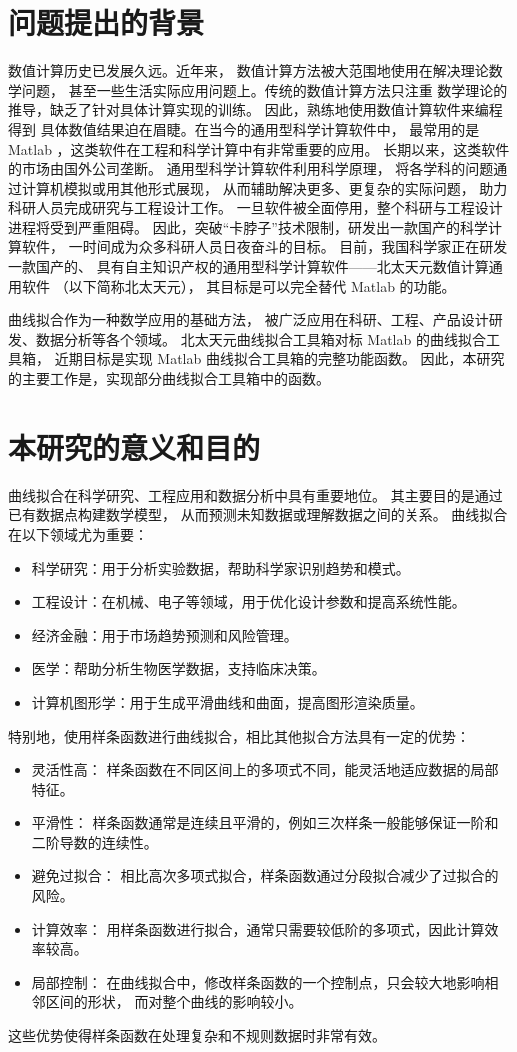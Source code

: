 \section{问题提出的背景}
数值计算历史已发展久远。近年来，
数值计算方法被大范围地使用在解决理论数学问题，
甚至一些生活实际应用问题上。传统的数值计算方法只注重
数学理论的推导，缺乏了针对具体计算实现的训练。
因此，熟练地使用数值计算软件来编程得到
具体数值结果迫在眉睫。在当今的通用型科学计算软件中，
最常用的是 Matlab ，这类软件在工程和科学计算中有非常重要的应用。
长期以来，这类软件的市场由国外公司垄断。
通用型科学计算软件利用科学原理，
将各学科的问题通过计算机模拟或用其他形式展现，
从而辅助解决更多、更复杂的实际问题，
助力科研人员完成研究与工程设计工作。
一旦软件被全面停用，整个科研与工程设计进程将受到严重阻碍。
因此，突破“卡脖子”技术限制，研发出一款国产的科学计算软件，
一时间成为众多科研人员日夜奋斗的目标。
目前，我国科学家正在研发一款国产的、
具有自主知识产权的通用型科学计算软件——北太天元数值计算通用软件
（以下简称北太天元），
其目标是可以完全替代 Matlab 的功能。\cite{baltamChinese}

曲线拟合作为一种数学应用的基础方法，
被广泛应用在科研、工程、产品设计研发、数据分析等各个领域。
北太天元曲线拟合工具箱对标 Matlab 的曲线拟合工具箱，
近期目标是实现 Matlab 曲线拟合工具箱的完整功能函数。
因此，本研究的主要工作是，实现部分曲线拟合工具箱中的函数。

\section{本研究的意义和目的}

\par 曲线拟合在科学研究、工程应用和数据分析中具有重要地位。
其主要目的是通过已有数据点构建数学模型，
从而预测未知数据或理解数据之间的关系。
曲线拟合在以下领域尤为重要：
\begin{itemize}
\item 科学研究：用于分析实验数据，帮助科学家识别趋势和模式。
\item 工程设计：在机械、电子等领域，用于优化设计参数和提高系统性能。
\item 经济金融：用于市场趋势预测和风险管理。
\item 医学：帮助分析生物医学数据，支持临床决策。
\item 计算机图形学：用于生成平滑曲线和曲面，提高图形渲染质量。
\end{itemize}
特别地，使用样条函数进行曲线拟合，相比其他拟合方法具有一定的优势：
\begin{itemize}
\item 灵活性高：
  样条函数在不同区间上的多项式不同，能灵活地适应数据的局部特征。
\item 平滑性：
  样条函数通常是连续且平滑的，例如三次样条一般能够保证一阶和二阶导数的连续性。
\item 避免过拟合：
  相比高次多项式拟合，样条函数通过分段拟合减少了过拟合的风险。
\item 计算效率：
  用样条函数进行拟合，通常只需要较低阶的多项式，因此计算效率较高。
\item 局部控制：
  在曲线拟合中，修改样条函数的一个控制点，只会较大地影响相邻区间的形状，
  而对整个曲线的影响较小。
\end{itemize}
这些优势使得样条函数在处理复杂和不规则数据时非常有效。
